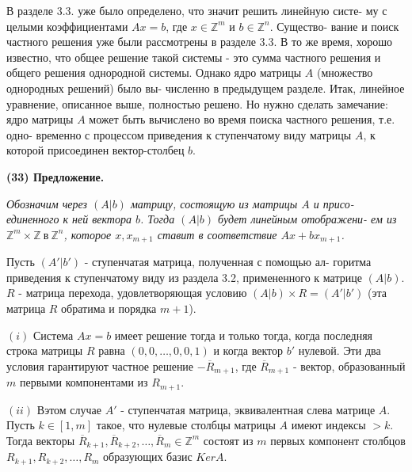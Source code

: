 \documentclass{mai_book}
\begin{document}
	\noindent
	В разделе 3.3. уже было определено, что значит решить линейную систе-\linebreak
	му с целыми коэффициентами $Ax = b$, где $x \in \mathbb Z^m$ и $b \in \mathbb Z^n$. Существо-\linebreak
	вание и поиск частного решения уже были рассмотрены в разделе 3.3.\linebreak
	В то же время, хорошо известно, что общее решение такой системы -\linebreak
	это сумма частного решения и общего решения однородной системы.\linebreak
	Однако ядро матрицы $A$ (множество однородных решений) было вы-\linebreak
	численно в предыдущем разделе. Итак, линейное уравнение, описанное\linebreak
	выше, полностью решено. Но нужно сделать замечание: ядро матрицы\linebreak
	$A$ может быть вычислено во время поиска частного решения, т.е. одно-\linebreak
	временно с процессом приведения к ступенчатому виду матрицы $A$, к\linebreak
	которой присоединен вектор-столбец $b$.
	
	\noindent
	{\bf (33) Предложение.}
	
	{\it Обозначим через $(A | b)$ матрицу, состоящую из матрицы $A$ и присо-\linebreak
	единенного к ней вектора $b$. Тогда $(A | b)$ будет линейным отображени-\linebreak
	ем из $\mathbb Z^m \times \mathbb Z \ \text{в} \ \mathbb Z^n$, которое $x, x_{m + 1}$ ставит в соответствие $Ax + bx_{m + 1}$.
	
	Пусть $(A' | b')$ - ступенчатая матрица, полученная с помощью ал-\linebreak
	горитма приведения к ступенчатому виду из раздела 3.2, примененного\linebreak
	к матрице $(A | b)$. $R$ - матрица перехода, удовлетворяющая условию\linebreak
	$(A | b)\times R = (A' | b')$ (эта матрица $R$ обратима и порядка $m + 1$).
	
	$(i)$ Система $Ax = b$ имеет решение тогда и только тогда, когда\linebreak
	последняя строка матрицы $R$ равна $(0, 0, \ldots, 0, 0, 1)$ и когда вектор $b'$\linebreak
	нулевой. Эти два условия гарантируют частное решение $-\overline{R}_{m + 1}$, где\linebreak
	$\overline{R}_{m + 1}$ - вектор, образованный $m$ первыми компонентами из $R_{m + 1}$.
	
	$(ii)$ Вэтом случае $A'$ - ступенчатая матрица, эквивалентная слева\linebreak
	матрице $A$. Пусть $k \in [1, m]$ такое, что нулевые столбцы матрицы $A$\linebreak
	имеют индексы $> k$. Тогда векторы $\overline{R}_{k + 1}, \overline{R}_{k + 2}, \ldots, \overline{R}_{m} \in \mathbb Z^m$ состоят из\linebreak
	$m$ первых компонент столбцов $R_{k + 1}, R_{k + 2}, \ldots, R_{m}$ образующих базис\linebreak
	$KerA$.}
	
\end{document}
